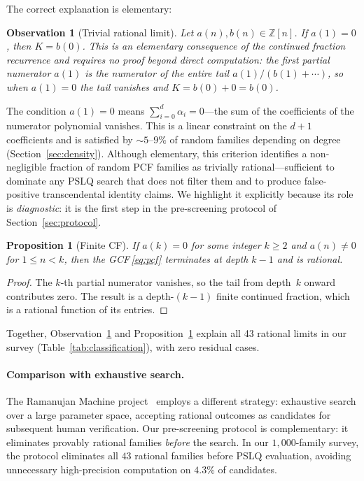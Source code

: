 \documentclass[11pt]{amsart}
\newtheorem{proposition}[theorem]{Proposition}
\newtheorem{observation}[theorem]{Observation}
\theoremstyle{definition}
\theoremstyle{remark}
\begin{document}
The correct explanation is elementary:

\begin{observation}[Trivial rational limit]\label{thm:main}
  Let $a(n),b(n)\in\mathbb{Z}[n]$.
  If $a(1)=0$, then $K = b(0)$.
  This is an elementary consequence of the continued fraction
  recurrence and requires no proof beyond direct computation:
  the first partial numerator $a(1)$ is the numerator of the entire
  tail $a(1)/(b(1)+\cdots)$, so when $a(1)=0$ the tail vanishes and
  $K = b(0) + 0 = b(0)$.
\end{observation}

The condition $a(1)=0$ means $\sum_{i=0}^d \alpha_i = 0$---the sum
of the coefficients of the numerator polynomial vanishes.
This is a linear constraint on the $d+1$ coefficients and is satisfied
by $\sim\!5$--$9\%$ of random families depending on degree
(Section~\ref{sec:density}).
Although elementary, this criterion identifies a non-negligible
fraction of random PCF families as trivially rational---sufficient
to dominate any PSLQ search that does not filter them and to produce
false-positive transcendental identity claims.
We highlight it explicitly because its role is \emph{diagnostic}:
it is the first step in the pre-screening protocol of
Section~\ref{sec:protocol}.

\begin{proposition}[Finite CF]\label{prop:finite}
  If $a(k)=0$ for some integer $k\ge 2$ and $a(n)\ne 0$ for $1\le n<k$,
  then the GCF\,\eqref{eq:pcf} terminates at depth $k-1$ and is
  rational.
\end{proposition}

\begin{proof}
  The $k$-th partial numerator vanishes, so the tail from depth~$k$
  onward contributes zero.  The result is a depth-$(k-1)$ finite
  continued fraction, which is a rational function of its entries.
\end{proof}

Together, Observation~\ref{thm:main} and Proposition~\ref{prop:finite}
explain all 43 rational limits in our survey (Table~\ref{tab:classification}),
with zero residual cases.

\paragraph{Comparison with exhaustive search.}
The Ramanujan Machine project~\cite{raayoni2021} employs a different
strategy: exhaustive search over a large parameter space, accepting
rational outcomes as candidates for subsequent human verification.
Our pre-screening protocol is complementary: it eliminates provably
rational families \emph{before} the search.
In our $1{,}000$-family survey, the protocol eliminates all $43$
rational families before PSLQ evaluation, avoiding unnecessary
high-precision computation on $4.3\%$ of candidates.
\end{document}
